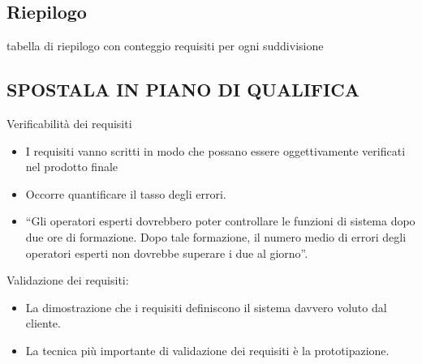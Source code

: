 \subsection{Riepilogo}
tabella di riepilogo con conteggio requisiti per ogni suddivisione

\subsection{SPOSTALA IN PIANO DI QUALIFICA}

Verificabilità dei requisiti
    \begin{itemize}
    	\item I requisiti vanno scritti in modo che possano essere
    oggettivamente verificati nel prodotto finale
        \item Occorre quantificare il tasso degli errori.
        \item “Gli operatori esperti dovrebbero poter controllare le
    funzioni di sistema dopo due ore di formazione. Dopo tale formazione, il numero medio di errori degli operatori esperti non dovrebbe superare i due al giorno”.
    \end{itemize}
    
    Validazione dei requisiti:
    \begin{itemize}
        \item La dimostrazione che i requisiti definiscono il
    sistema davvero voluto dal cliente.
        \item La tecnica più importante di validazione dei
    requisiti è la prototipazione.
    \end{itemize}
